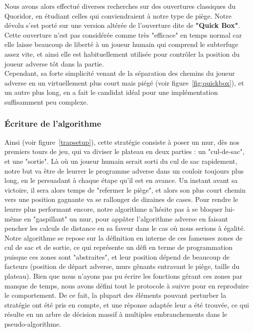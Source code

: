 \documentclass[a4paper]{article}
\begin{document}
Nous avons alors effectué diverses recherches sur des ouvertures classiques\cite{openings} du Quoridor, en étudiant celles qui conviendraient à notre type de piège. Notre dévolu s'est porté sur une version altérée de l'ouverture dite de \textbf{"Quick Box"}\cite{quickbox}. Cette ouverture n'est pas considérée comme très "efficace" en temps normal car elle laisse beaucoup de liberté à un joueur humain qui comprend le subterfuge assez vite, et ainsi elle est habituellement utilisée pour contrôler la position du joueur adverse tôt dans la partie. \\

Cependant, sa forte simplicité venant de la séparation des chemins du joueur adverse en un virtuellement plus court mais piégé (voir figure~\ref{fig:quickbox}), et un autre plus long, en a fait le candidat idéal pour une implémentation suffisamment peu complexe. 

\subsubsection{Écriture de l'algorithme}

Ainsi (voir figure~\ref{trapsetup}), cette stratégie consiste à poser un mur, dès nos premiers tours de jeu, qui va diviser le plateau en deux parties : un "cul-de-sac", et une "sortie". Là où un joueur humain serait sorti du cul de sac rapidement, notre but va être de leurrer le programme adverse dans un couloir toujours plus long, en le persuadant à chaque étape qu'il est en avance. Un instant avant sa victoire, il sera alors temps de "refermer le piège", et alors son plus court chemin vers une position gagnante va se rallonger de dizaines de cases. Pour rendre le leurre plus performant encore, notre algorithme n'hésite pas à se bloquer lui-même en "gaspillant" un mur, pour appâter l'algorithme adverse en faisant pencher les calculs de distance en sa faveur dans le cas où nous serions à égalité.\\

Notre algorithme se repose sur la définition en interne de ces fameuses zones de cul de sac et de sortie, ce qui représente un défi en terme de programmation puisque ces zones sont "abstraites", et leur position dépend de beaucoup de facteurs (position de départ adverse, murs gênants entravant le piège, taille du plateau). Bien que nous n'ayons pas pu écrire les fonctions gérant ces zones par manque de temps, nous avons défini tout le protocole à suivre pour en reproduire le comportement. De ce fait, la plupart des éléments pouvant perturber la stratégie ont été pris en compte, et une réponse adaptée leur a été trouvée, ce qui résulte en un arbre de décision massif à multiples embranchements dans le pseudo-algorithme. \\
\end{document}
